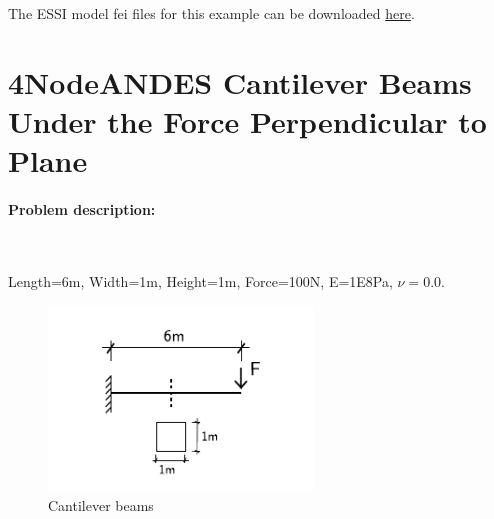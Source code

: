 \documentclass[fleqn,11pt]{article}
\begin{document}
The ESSI model fei files for this example can be downloaded 
\href{https://github.com/BorisJeremic/Real-ESSI-Examples/blob/master/model_fei_file/27NodeBrick_static/27NodeBrick_static.tgz?raw=true}{here}.
























\section{4NodeANDES Cantilever Beams Under the Force Perpendicular to Plane}

\paragraph{Problem description:} ~

Length=6m, Width=1m, Height=1m, Force=100N, E=1E8Pa, $\nu=0.0$. 

\begin{figure}[!htb]
  \centering
  \includegraphics[width=7cm]{../Figure-files/_Chapter_Appendix_Illustrative_Examples/cantilever_6.pdf}
  \caption{Cantilever beams}
  \label{fig Problem description for cantilever 4}
\end{figure}
\end{document}
